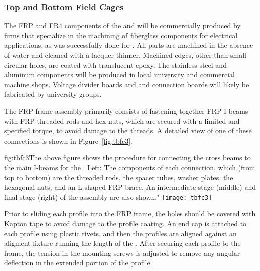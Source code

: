 \subsubsection{Top and Bottom Field Cages}

The FRP and FR4 components of the   and  will be commercially produced by firms that specialize in the machining of fiberglass components for electrical applications, as was successfully done for . All parts are machined in the absence of water and cleaned with a lacquer thinner. Machined edges, other than small circular holes, are coated with translucent epoxy. The stainless steel and aluminum components will be produced in local university and commercial machine shops. Voltage divider boards and  and  connection boards will likely be fabricated by university groups.

The FRP frame assembly primarily consists of fastening together FRP I-beams with FRP threaded rods and hex nuts, which are secured with a limited and specified torque, to avoid damage to the threads. A detailed view of one of these connections is shown in Figure~\ref{fig:tbfc3}.

\begin{dunefigure}{fig:tbfc3}{The above figure shows the procedure for connecting the cross beams to the main I-beams for the . Left: The components of each connection, which (from top to bottom) are the threaded rods, the spacer tubes, washer plates, the hexagonal nuts, and an L-shaped FRP brace. An intermediate stage (middle) and final stage (right) of the assembly are also shown."}
\texttt{[image: tbfc3]}
\end{dunefigure}

Prior to sliding each profile into the FRP frame, the holes should be covered with Kapton tape to avoid damage to the profile coating. An end cap is attached to each profile using plastic rivets, and then the profiles are aligned against an aligment fixture running the length of the . After securing each profile to the frame, the tension in the mounting screws is adjusted to remove any angular deflection in the extended portion of the profile.

